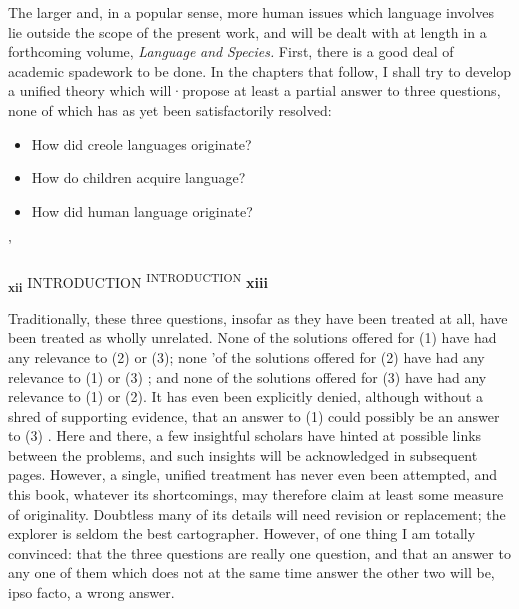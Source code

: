 The larger and, in a popular sense, more human issues which language involves lie outside the scope of the present work, and will be dealt with at length in a forthcoming volume, \textit{Language} \textit{and} \textit{Species.} First, there is a good deal of academic spadework to be done. In the chapters that follow, I shall try to develop a unified theory which will·propose at least a partial answer to three questions, none of which has as yet been satisfactorily resolved:

\begin{itemize}
\item How did creole languages originate?
\item How do children acquire language?
\item How did human language originate?
\end{itemize}

'

\textbf{\textsubscript{xii }}INTRODUCTION \textsuperscript{INTRODUCTION} \textbf{xiii}

Traditionally, these three questions, insofar as they have been treated at all, have been treated as wholly unrelated. None of the solutions offered for (1) have had any relevance to (2) or (3); none 'of the solu\-tions offered for (2) have had any relevance to (1) or (3) ; and none of the solutions offered for (3) have had any relevance to (1) or (2). It has even been explicitly denied, although without a shred of support\-ing evidence, that an answer to (1) could possibly be an answer to (3) \citep{Sankoff1979}. Here and there, a few insightful scholars have hinted at possible links between the problems, and such insights will be ac\-knowledged in subsequent pages. However, a single, unified treatment has never even been attempted, and this book, whatever its short\-comings, may therefore claim at least some measure of originality. Doubtless many of its details will need revision or replacement; the explorer is seldom the best cartographer. However, of one thing I am totally convinced: that the three questions are really one question, and that an answer to any one of them which does not at the same time answer the other two will be, ipso facto, a wrong answer.


